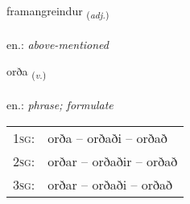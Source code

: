 \documentclass[frontgrid, backgrid]{flacards}\usepackage[]{graphicx}\usepackage[]{xcolor}
\begin{document}
\renewcommand{\flhead}{\vskip5pt \fboxsep=0pt {\small\bfseries\footnotesize Lýsingarorð | Adjective}}
\renewcommand{\fcfoot}{\vskip5pt \fboxsep=0pt \hspace{2pt}{\small\bfseries\footnotesize 2K}}

\renewcommand{\blhead}{\vskip5pt {\small\bfseries\footnotesize Lýsingarorð | Adjective }}
\renewcommand{\bcfoot}{\vskip5pt \hspace{2pt}{\small\bfseries\footnotesize 2K}}


{framangreindur \small{\textsubscript{(\textit{adj.})}} \\[1ex] %
\textphonetic{[fraːmankreintʏr]} \\
en.: \emph{above-mentioned} \\  [2ex]
\renewcommand*{\arraystretch}{0.8}
}

\renewcommand{\flhead}{\vskip5pt \fboxsep=0pt {\small\bfseries\footnotesize Sagnorð | Verb}}
\renewcommand{\fcfoot}{\vskip5pt \fboxsep=0pt \hspace{2pt}{\small\bfseries\footnotesize 2K}}

\renewcommand{\blhead}{\vskip5pt {\small\bfseries\footnotesize Sagnorð | Verb }}
\renewcommand{\bcfoot}{\vskip5pt \hspace{2pt}{\small\bfseries\footnotesize 2K}}


{orða \small{\textsubscript{(\textit{v.})}} \\[1ex] %
\textphonetic{[ɔrða]} \\
en.: \emph{phrase; formulate} \\  [2ex]
\renewcommand*{\arraystretch}{0.8}
\begin{tabular}{p{1cm}l}
\textsc{1sg}: & orða -- orðaði -- orðað \\ 
\textsc{2sg}: & orðar -- orðaðir -- orðað \\ 
\textsc{3sg}: & orðar -- orðaði -- orðað \\ 
\end{tabular}
}
\end{document}
